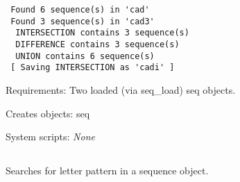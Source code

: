 \begin{description}
\begin{enumerate}
\begin{verbatim}
 Found 6 sequence(s) in 'cad'
 Found 3 sequence(s) in 'cad3'
  INTERSECTION contains 3 sequence(s)
  DIFFERENCE contains 3 sequence(s)
  UNION contains 6 sequence(s)
 [ Saving INTERSECTION as 'cadi' ]

\end{verbatim}

\end{enumerate}


\item{Requirements:} Two loaded (via seq\_load) seq objects.


\item{Creates objects:} seq


\item{System scripts:} {\em None}

\end{description}



\subsection[seq\_pattern]{  }



Searches for letter pattern in a sequence object.


